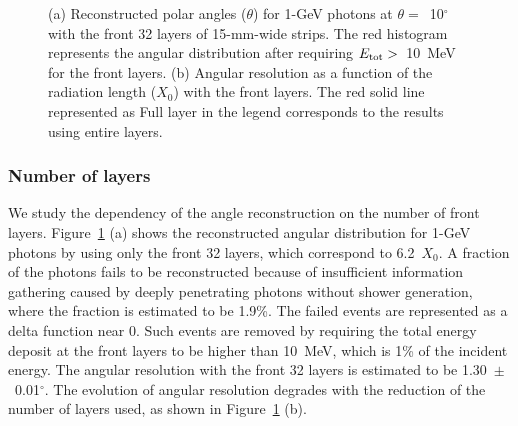 \documentclass[12pt,times,draftclsnofoot,a4paper]{elsarticle}
\begin{document}
\begin{figure}[!hbt]
\centering
{}
\caption{ (a) Reconstructed polar angles ($\theta$) for 1-GeV photons at $\theta=$~10$^{\circ}$  with the front 32 layers of 15-mm-wide strips. The red histogram represents the angular distribution after requiring $E_{\rm{tot}}>$~10~MeV for the front layers. (b) Angular resolution as a function of the radiation length ($X_{0}$) with the front layers. The red solid line represented as Full layer in the legend corresponds to the results using entire layers.}
\label{fig:angle_reco_layer}
\end{figure}

\subsubsection{Number of layers}
We study the dependency of the angle reconstruction on the number of front layers. Figure~\ref{fig:angle_reco_layer} (a) shows the reconstructed angular distribution for 1-GeV photons by using only the front 32 layers, which correspond to 6.2~$X_{0}$. A fraction of the photons fails to be reconstructed because of insufficient information gathering caused by deeply penetrating photons without shower generation, where the fraction is estimated to be 1.9\%. The failed events are represented as a delta function near 0. Such events are removed by requiring the total energy deposit at the front layers to be higher than 10~MeV, which is 1\% of the incident energy. The angular resolution with the front 32 layers is estimated to be 1.30~$\pm$~0.01$^{\circ}$. The evolution of angular resolution degrades with the reduction of the number of layers used, as shown in Figure~\ref{fig:angle_reco_layer} (b).
\end{document}
